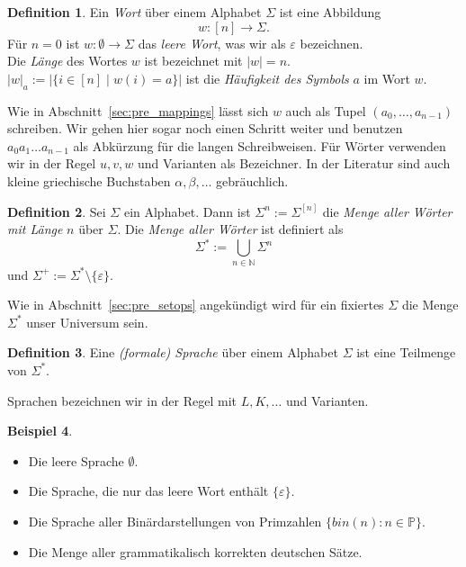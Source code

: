 \documentclass[11pt, a4paper]{article}
\theoremstyle{definition}
\newtheorem{definition}{Definition}[section]
\newtheorem{example}[definition]{Beispiel}
\theoremstyle{plain}
\numberwithin{equation}{section}
\begin{document}
\begin{definition}
	Ein \textit{Wort} über einem Alphabet \( \Sigma \) ist eine Abbildung
	\[
		w: [n] \to \Sigma.
	\]
	Für \( n = 0 \) ist \( w : \emptyset \to \Sigma \) das \textit{leere Wort}, was wir als \( \varepsilon \) bezeichnen.\\
	Die \textit{Länge} des Wortes \( w \) ist bezeichnet mit \( \left| w \right| = n \).\\
	\( \left| w \right|_a := \left| \{ i \in [n] \mid w(i) = a \} \right| \) ist die \textit{Häufigkeit des Symbols} \( a \) im Wort \( w \).
\end{definition}
Wie in Abschnitt~\ref{sec:pre_mappings} lässt sich \( w \) auch als Tupel \( (a_0, \ldots, a_{n-1}) \) schreiben. Wir gehen hier sogar noch einen Schritt weiter und benutzen \( a_0 a_1 \ldots a_{n-1} \) als Abkürzung für die langen Schreibweisen. Für Wörter verwenden wir in der Regel \( u, v, w \) und Varianten als Bezeichner. In der Literatur sind auch kleine griechische Buchstaben \( \alpha, \beta, \ldots \) gebräuchlich.
\begin{definition}
	Sei \( \Sigma \) ein Alphabet. Dann ist \( \Sigma^n := \Sigma^{[n]} \) die \textit{Menge aller Wörter mit Länge} \( n \) über \( \Sigma \).
	Die \textit{Menge aller Wörter} ist definiert als
	\[
		\Sigma^\ast := \bigcup_{n \in \mathbb{N}} \Sigma^n
	\]
	und \( \Sigma^+ := \Sigma^\ast \setminus \{ \varepsilon \} \).
\end{definition}
Wie in Abschnitt~\ref{sec:pre_setops} angekündigt wird für ein fixiertes \( \Sigma \) die Menge \( \Sigma^\ast \) unser Universum sein.
\begin{definition}
	Eine \textit{(formale) Sprache} über einem Alphabet \( \Sigma \) ist eine Teilmenge von \( \Sigma^\ast \).
\end{definition}
Sprachen bezeichnen wir in der Regel mit \( L, K, \ldots \) und Varianten.
\begin{example}
	\
	\begin{itemize}
		\item Die leere Sprache \( \emptyset \).
		\item Die Sprache, die nur das leere Wort enthält \( \{ \varepsilon \} \).
		\item Die Sprache aller Binärdarstellungen von Primzahlen \( \{ bin(n) : n \in \mathbb{P} \} \).
		\item Die Menge aller grammatikalisch korrekten deutschen Sätze.
	\end{itemize}
\end{example}
\end{document}
